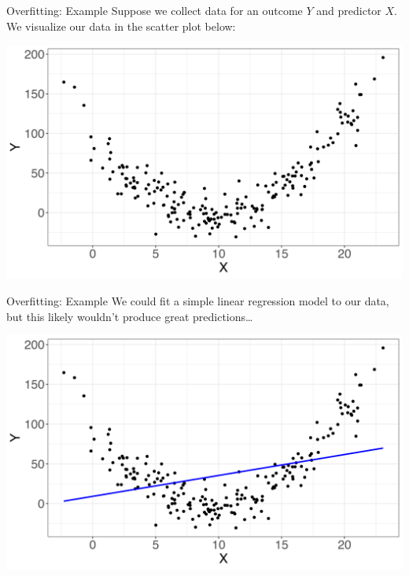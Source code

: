 \documentclass[10pt,t]{beamer}
\begin{document}
\begin{frame}{Overfitting: Example}
Suppose we collect data for an outcome $Y$ and predictor $X$. We visualize our data in the scatter plot below:

\vspace{0.3cm}

\centering \includegraphics[scale=0.4]{overfit1.png}
\end{frame}

\begin{frame}{Overfitting: Example}
We could fit a simple linear regression model to our data, but this likely wouldn't produce great predictions\dots

\vspace{0.3cm}

\centering \includegraphics[scale=0.4]{overfit2.png}
\end{frame}
\end{document}
